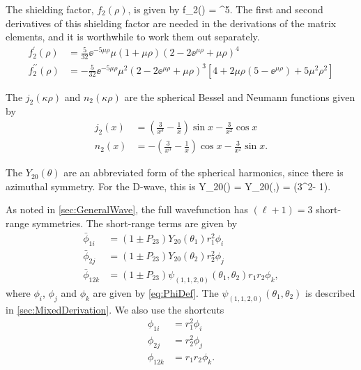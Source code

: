 \documentclass[Dissertation.tex]{subfiles}
\begin{document}
\noindent The shielding factor, $f_{2}(\rho)$, is given by
\beq
f_{2}(\rho) = ^5.
\label{eq:DWaveShielding}
\eeq
The first and second derivatives of this shielding factor are needed in the
derivations of the matrix elements, and it is worthwhile to work them out separately.
\begin{subequations}
\label{eq:DWaveShieldingDer}
\begin{align}
f_{2}^\prime(\rho) &= \frac{5}{32} \ee^{-5 \mu \rho} \mu (1 + \mu \rho) (2 - 2 \ee^{\mu \rho} + \mu \rho)^4 \\
f_{2}^{\prime\prime}(\rho) &= -\frac{5}{32} \ee^{-5 \mu \rho} \mu^2 (2 - 2 \ee^{\mu \rho} + \mu \rho)^3 \left[4 + 2\mu\rho (5 - \ee^{\mu \rho}) + 5 \mu^2 \rho^2\right]
\end{align}
\end{subequations}

\noindent The $j_2(\kappa\rho)$ and $n_2(\kappa\rho)$ are the spherical Bessel
and Neumann functions given by \cite[p. 729]{Arfken2005}
\begin{subequations}
\label{eq:DWaveBessel}
\begin{align}
j_2(x) & = \left(\frac{3}{x^3}-\frac{1}{x}\right)\sin x - \frac{3}{x^2}\cos x \label{eq:Bessel2} \\
n_2(x) & = -\left(\frac{3}{x^3}-\frac{1}{x}\right)\cos x - \frac{3}{x^2}\sin x. \label{eq:Neumann2}
\end{align}
\end{subequations}

\noindent The $Y_{20}(\theta)$ are an abbreviated form of the spherical harmonics,
since there is azimuthal symmetry. For the D-wave, this is
\beq
\label{eq:DWaveSpherHarm}
Y_{20}(\theta) = Y_{20}(\theta,\varphi) =  (3\cos^2\theta - 1).
\eeq

As noted in \cref{sec:GeneralWave}, the full wavefunction has $(\ell+1) = 3$
short-range symmetries. The short-range terms are given by
\begin{subequations}
\label{eq:DWavePhiBar}
\begin{align}
\bar{\phi}_{1i} &= \left(1 \pm P_{23}\right) Y_{20}(\theta_1) r_1^2 \phi_i \label{eq:DWavePhi1i}\\
\bar{\phi}_{2j} &= \left(1 \pm P_{23}\right) Y_{20}(\theta_2) r_2^2 \phi_j \label{eq:DWavePhi2j}\\
\bar{\phi}_{12k} &= \left(1 \pm P_{23}\right) \psi_{(1,1,2,0)}(\theta_1,\theta_2) r_1 r_2 \phi_k, \label{eq:DWavePhi12k}
\end{align}
\end{subequations}
where $\phi_i$, $\phi_j$ and $\phi_k$ are given by \cref{eq:PhiDef}. The
$\psi_{(1,1,2,0)}(\theta_1,\theta_2)$ is described in \cref{sec:MixedDerivation}.
We also use the shortcuts
\begin{subequations}
\label{eq:DWavePhi}
\begin{align}
\phi_{1i} &= r_1^2 \phi_i \\
\phi_{2j} &= r_2^2 \phi_j \\
\phi_{12k} &= r_1 r_2 \phi_k.
\end{align}
\end{subequations}
\end{document}
